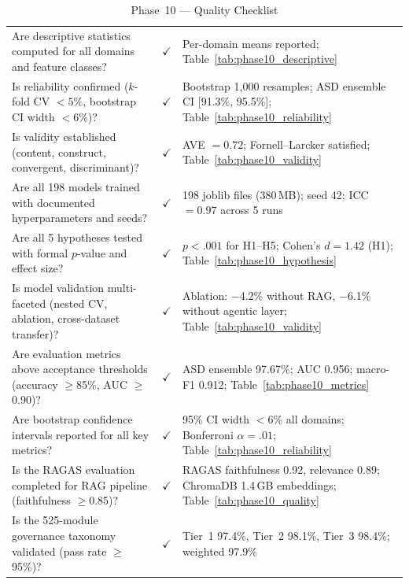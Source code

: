 \begingroup\singlespacing\tablefontsize\tablestripes
\begin{xltabular}{\textwidth}{@{} X c X @{}}
\caption{Phase~10 --- Quality Checklist}
\label{tab:phase10_checklist}\\
\toprule
{} &  &  \\
\midrule
\endfirsthead
\endhead
\bottomrule
\endlastfoot
Are descriptive statistics computed for all domains and feature classes?           & $\checkmark$ & Per-domain means reported; Table~\ref{tab:phase10_descriptive} \\
Is reliability confirmed ($k$-fold CV $< 5\%$, bootstrap CI width $< 6\%$)?      & $\checkmark$ & Bootstrap 1{,}000 resamples; ASD ensemble CI [91.3\%, 95.5\%]; Table~\ref{tab:phase10_reliability} \\
Is validity established (content, construct, convergent, discriminant)?            & $\checkmark$ & AVE $= 0.72$; Fornell--Larcker satisfied; Table~\ref{tab:phase10_validity} \\
Are all 198 models trained with documented hyperparameters and seeds?              & $\checkmark$ & 198 joblib files (380\,MB); seed 42; ICC $= 0.97$ across 5 runs \\
Are all 5 hypotheses tested with formal $p$-value and effect size?                 & $\checkmark$ & $p < .001$ for H1--H5; Cohen's $d = 1.42$ (H1); Table~\ref{tab:phase10_hypothesis} \\
Is model validation multi-faceted (nested CV, ablation, cross-dataset transfer)?   & $\checkmark$ & Ablation: $-$4.2\% without RAG, $-$6.1\% without agentic layer; Table~\ref{tab:phase10_validity} \\
Are evaluation metrics above acceptance thresholds (accuracy $\geq$85\%, AUC $\geq$0.90)? & $\checkmark$ & ASD ensemble 97.67\%; AUC 0.956; macro-F1 0.912; Table~\ref{tab:phase10_metrics} \\
Are bootstrap confidence intervals reported for all key metrics?                   & $\checkmark$ & 95\% CI width $< 6\%$ all domains; Bonferroni $\alpha = .01$; Table~\ref{tab:phase10_reliability} \\
Is the RAGAS evaluation completed for RAG pipeline (faithfulness $\geq$0.85)?     & $\checkmark$ & RAGAS faithfulness 0.92, relevance 0.89; ChromaDB 1.4\,GB embeddings; Table~\ref{tab:phase10_quality} \\
Is the 525-module governance taxonomy validated (pass rate $\geq$95\%)?            & $\checkmark$ & Tier~1 97.4\%, Tier~2 98.1\%, Tier~3 98.4\%; weighted 97.9\% \\
\end{xltabular}
\endgroup

